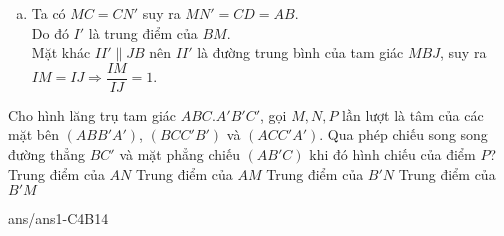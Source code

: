 \begin{ex}
{\begin{enumerate}[a)]
			Từ phân tích trên suy ra cách dựng: 
			\begin{itemize}
				\item  Lấy $I'=AN'\cap BM$.
				\item Trong $\left( ANN' \right)$ dựng $II'\parallel NN'$ cắt $AN$ tại $I$.
				\item Vẽ đường thẳng $MI$, đó chính là đường thẳng cần dựng.
			\end{itemize}
		\item Ta có $MC=CN'$ suy ra $MN'=CD=AB$.\\
		Do đó $I'$ là trung điểm của $BM$.\\
		Mặt khác $II'\parallel JB$ nên $II'$ là đường trung bình của tam giác $MBJ$, suy ra $IM=IJ\Rightarrow \dfrac{IM}{IJ}=1$.
		\end{enumerate}
	}
\end{ex}
\begin{ex}%
	Cho hình lăng trụ tam giác $ABC.A'B'C'$, gọi $M,N,P$ lần lượt là tâm của các mặt bên $\left( ABB'A' \right)$, $\left( BCC'B' \right)$ và $\left( ACC'A' \right)$. Qua phép chiếu song song đường thẳng $BC'$ và mặt phẳng chiếu $\left( AB'C \right)$ khi đó hình chiếu của điểm $P$?
	\choice
		{\True Trung điểm của $AN$}
		{Trung điểm của $AM$}
		{Trung điểm của $B'N$}
		{Trung điểm của $B'M$}
	\loigiai{}
\end{ex}
\begin{indapan}{10}
	{ans/ans1-C4B14}
\end{indapan}